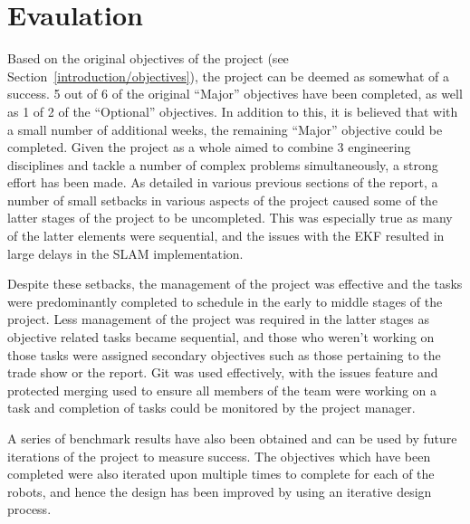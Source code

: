 
\chapter{Evaulation}\label{eval}
Based on the original objectives of the project (see Section~\ref{introduction/objectives}), the project can be deemed as somewhat of a success. 5 out of 6 of 
the original ``Major'' objectives have been completed, as well as 1 of 2 of 
the ``Optional'' objectives. In addition to this, it is believed that with a 
small number of additional weeks, the remaining ``Major'' objective could 
be completed. Given the project as a whole aimed to combine 3 engineering 
disciplines and tackle a number of complex problems simultaneously, a strong 
effort has been made. 
As detailed in various previous sections of the report, a number of small setbacks in 
various aspects of the project caused some of the latter stages of the project to be 
uncompleted. This was especially true as many of the latter elements were sequential, 
and the issues with the EKF resulted in large delays in the SLAM implementation. 

Despite these setbacks, the management of the project was effective and the  tasks were predominantly completed to schedule in the early to middle 
stages of the project. Less management of the project was required in the latter 
stages as objective related tasks became sequential, and those who weren't 
working on those tasks were assigned secondary objectives such as those 
pertaining to the trade show or the report. Git was used effectively, with the 
issues feature and protected merging used to ensure all members of the team were 
working on a task and completion of tasks could be monitored by the project 
manager. 

A series of benchmark results have also been obtained and can be used by future 
iterations of the project to measure success. The 
objectives which have been completed were also iterated upon multiple times to 
complete for each of the robots, and hence the design has 
been improved by using an iterative design process. 

